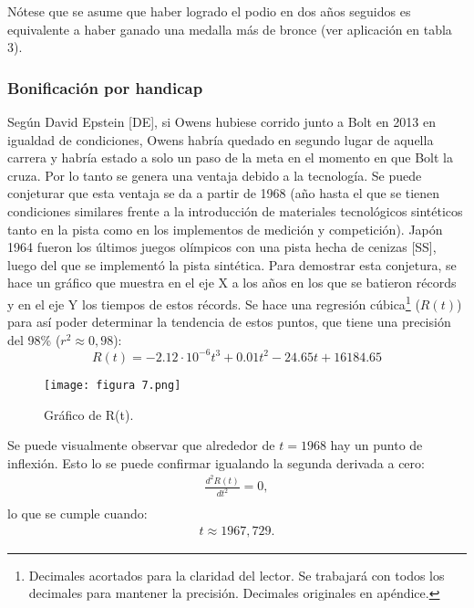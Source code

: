 \documentclass[a4paper]{article}
\begin{document}
Nótese que se asume que haber logrado el podio en dos años seguidos es equivalente a haber ganado una medalla más de bronce (ver aplicación en tabla 3).  \subsubsection{Bonificación por handicap}Según David Epstein [DE], si Owens hubiese corrido junto a Bolt en 2013 en igualdad de condiciones, Owens habría quedado en segundo lugar de aquella carrera y habría estado a solo un paso de la meta en el momento en que Bolt la cruza. Por lo tanto se genera una ventaja debido a la tecnología. Se puede conjeturar que esta ventaja se da a partir de 1968 (año hasta el que se tienen condiciones similares frente a la introducción de materiales tecnológicos sintéticos tanto en la pista como en los implementos de medición y competición).  Japón 1964 fueron los últimos juegos olímpicos con una pista hecha de cenizas [SS], luego del que se implementó la pista sintética. Para demostrar esta conjetura, se hace un gráfico que muestra en el eje X a los años en los que se batieron récords y en el eje Y los tiempos de estos récords. Se hace una regresión cúbica\footnote{Decimales acortados para la claridad del lector. Se trabajará con todos los decimales para mantener la precisión. Decimales originales en apéndice.} ($R(t)$) para así poder determinar la tendencia de estos puntos, que tiene una precisión del 98\% ($r^{2}\approx 0,98$):
\begin{equation*}
    R(t) = -2.12\cdot 10^{-6}t^{3} + 0.01t^{2} - 24.65t + 16184.65
\end{equation*} 
\begin{figure}[H]
    \begin{center}
    \texttt{[image: figura 7.png]}    
    \end{center}    
    \caption{Gráfico de R(t).}
\end{figure}
Se puede visualmente observar que alrededor de $t=1968$ hay un punto de inflexión. Esto lo se puede confirmar igualando la segunda derivada a cero:
\begin{align*}
   \frac{d^{2}R(t)}{dt^{2}} = 0, \\
\end{align*}
lo que se cumple cuando: 
\begin{align*}
    t \approx 1967,729. 
\end{align*}
\end{document}
